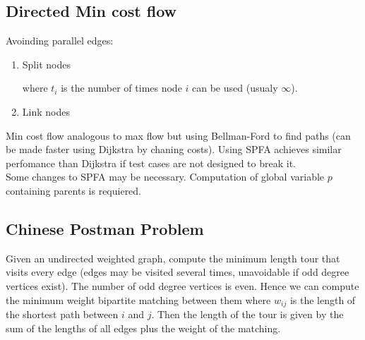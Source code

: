 \subsection{Directed Min cost flow}
Avoinding parallel edges:
\begin{enumerate}
\item Split nodes
\begin{center}
\end{center}
where $t_i$ is the number of times node $i$ can be used (usualy $\infty$).\\

\item Link nodes
\begin{center}
\end{center}
\end{enumerate}



Min cost flow analogous to max flow but using Bellman-Ford to find paths (can be made faster using Dijkstra by chaning costs). Using SPFA achieves similar perfomance than Dijkstra if test cases are not designed to break it. \\



Some changes to SPFA may be necessary. Computation of global variable $p$ containing parents is requiered.

\subsection{Chinese Postman Problem}

Given an undirected weighted graph, compute the minimum length tour that visits every edge (edges may be visited several times, unavoidable if odd degree vertices exist). The number of odd degree vertices is even. Hence we can compute the minimum weight bipartite matching between them where $w_{ij}$ is the length of the shortest path between $i$ and $j$. Then the length of the tour is given by the sum of the lengths of all edges plus the weight of the matching.  